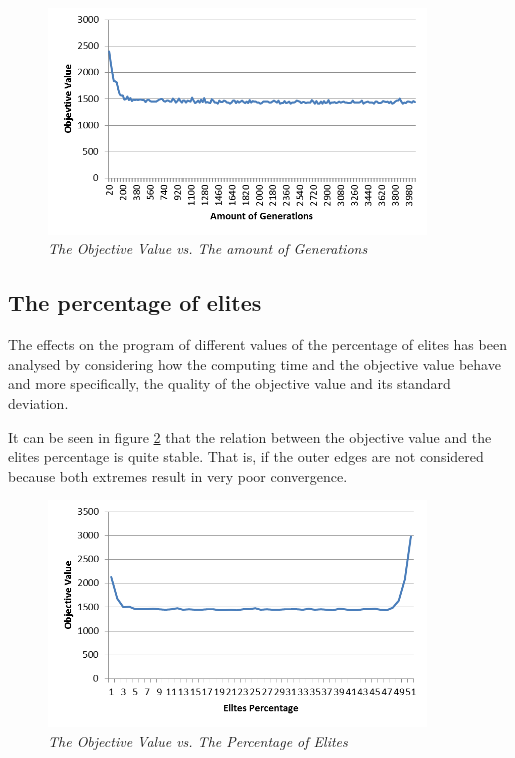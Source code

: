 \begin{figure}[H] 
	\centering
	\includegraphics[height=6cm]{OVG}
	\caption{\textsl{The Objective Value vs. The amount of Generations}}
	\label{OVG}
\end{figure}

\subsection{The percentage of elites}

\par
The effects on the program of different values of the percentage of elites has been analysed by considering how the computing time and the objective value behave and more specifically, the quality of the objective value and its standard deviation.

It can be seen in figure \ref{OVEP} that the relation between the objective value and the elites percentage is quite stable. That is, if the outer edges are not considered because both extremes result in very poor convergence.

	\begin{figure}[H] 
		\centering
		\includegraphics[height=6cm]{OVEP}
		\caption{\textsl{The Objective Value vs. The Percentage of Elites}}
		\label{OVEP}
	\end{figure}
	
